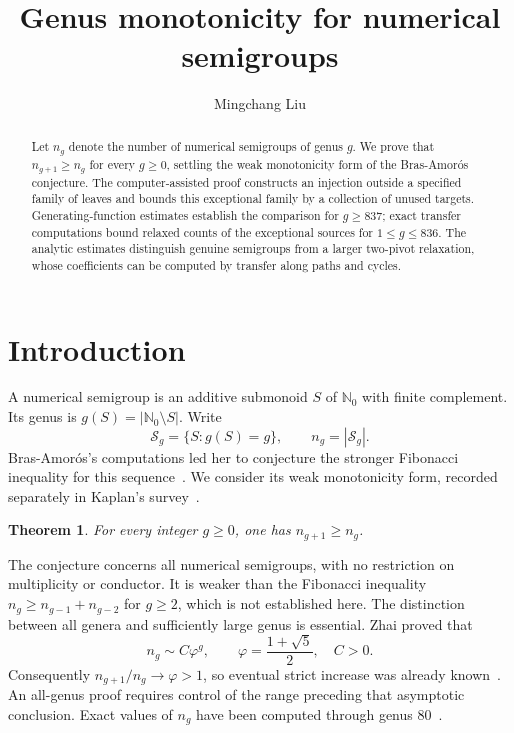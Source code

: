 \documentclass[11pt]{amsart}
\title{Genus monotonicity for numerical semigroups}
\author{Mingchang Liu}
\date{}
\newtheorem{theorem}{Theorem}[section]
\theoremstyle{definition}
\theoremstyle{remark}
\newcommand{\N}{\mathbb N_0}
\numberwithin{equation}{section}
\begin{document}
\begin{abstract}
Let $n_g$ denote the number of numerical semigroups of genus $g$.
We prove that $n_{g+1}\ge n_g$ for every $g\ge0$, settling
the weak monotonicity form of the Bras-Amor\'os conjecture.
The computer-assisted proof constructs an injection outside a specified family of leaves
and bounds this exceptional family by a collection of unused targets.
Generating-function estimates establish the comparison for $g\ge837$;
exact transfer computations bound relaxed counts of the exceptional
sources for $1\le g\le836$.
The analytic estimates distinguish genuine semigroups from a larger
two-pivot relaxation, whose coefficients can be computed by transfer
along paths and cycles.
\end{abstract}
\maketitle

\section{Introduction}

A numerical semigroup is an additive submonoid $S$ of $\N$ with finite
complement. Its genus is $g(S)=|\N\setminus S|$. Write
\[
 \mathcal S_g=\{S:g(S)=g\},\qquad n_g=|\mathcal S_g|.
\]
Bras-Amor\'os's computations led her to conjecture the stronger Fibonacci
inequality for this sequence~\cite{Bras}. We consider its weak monotonicity
form, recorded separately in Kaplan's survey~\cite[Conjecture~2]{Kaplan}.

\begin{theorem}\label{thm:main}
For every integer $g\ge0$, one has $n_{g+1}\ge n_g$.
\end{theorem}

The conjecture concerns all numerical semigroups, with no restriction on
multiplicity or conductor. It is weaker than the Fibonacci inequality
$n_g\ge n_{g-1}+n_{g-2}$ for $g\ge2$, which is not established here.
The distinction between all genera and sufficiently large genus is essential.
Zhai proved that
\begin{equation}\label{eq:known-asymptotic}
 n_g\sim C\varphi^g,\qquad
 \varphi=\frac{1+\sqrt5}{2},\quad C>0.
\end{equation}
Consequently $n_{g+1}/n_g\to\varphi>1$, so eventual strict increase was
already known~\cite{Zhai}. An all-genus proof requires control of the
range preceding that asymptotic conclusion. Exact values of $n_g$
have been computed through genus $80$~\cite[Section~4]{BT}.
\end{document}
